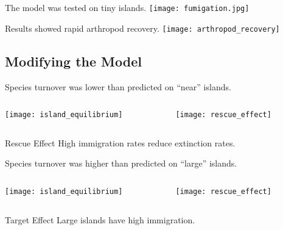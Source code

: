 \documentclass[xcolor=svgnames]{beamer}
\begin{document}
\begin{frame}{The model was tested  on tiny islands.}
	\centering
		\texttt{[image: fumigation.jpg]}
\end{frame}

\begin{frame}{Results showed rapid arthropod recovery.}
	\centering
		\texttt{[image: arthropod\_recovery]}
\end{frame}

\subsection{Modifying the Model}

\begin{frame}{Species turnover was lower than predicted on ``near'' islands.}
	\centering
	\begin{columns}[T]
		\begin{column}{0.4\textwidth}
			\texttt{[image: island\_equilibrium]}
		\end{column}
		\begin{column}{0.6\textwidth}
			\texttt{[image: rescue\_effect]}
		\end{column}
	\end{columns}
	\pause
	\pause
	\begin{block}{Rescue Effect}
		High immigration rates reduce extinction rates.
	\end{block}
\end{frame}

\begin{frame}{Species turnover was higher than predicted on ``large'' islands.}
	\centering
	\begin{columns}[T]
		\begin{column}{0.4\textwidth}
			\texttt{[image: island\_equilibrium]}
		\end{column}
		\begin{column}{0.6\textwidth}
			\texttt{[image: rescue\_effect]}
		\end{column}
	\end{columns}
	\pause
	\begin{block}{Target Effect}
		Large islands have high immigration.
	\end{block}
\end{frame}
\end{document}

